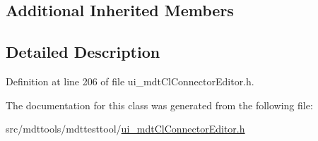 \subsection*{Additional Inherited Members}


\subsection{Detailed Description}


Definition at line 206 of file ui\-\_\-mdt\-Cl\-Connector\-Editor.\-h.



The documentation for this class was generated from the following file\-:\begin{DoxyCompactItemize}
\item 
src/mdttools/mdttesttool/\hyperlink{ui__mdt_cl_connector_editor_8h}{ui\-\_\-mdt\-Cl\-Connector\-Editor.\-h}\end{DoxyCompactItemize}
